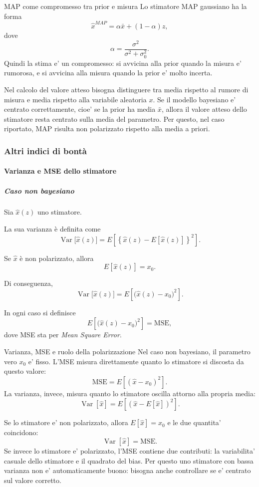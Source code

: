 \documentclass[11pt,a4paper]{article}
\begin{document}
\begin{spiegazione}{MAP come compromesso tra prior e misura}
Lo stimatore MAP gaussiano ha la forma
\[
\hat x^{MAP}
=
\alpha \bar x+(1-\alpha)z,
\]
dove
\[
\alpha=\frac{\sigma^2}{\sigma^2+\sigma_0^2}.
\]
Quindi la stima e' un compromesso: si avvicina alla prior quando la misura e' rumorosa, e si avvicina alla misura quando la prior e' molto incerta.

Nel calcolo del valore atteso bisogna distinguere tra media rispetto al rumore di misura e media rispetto alla variabile aleatoria $x$. Se il modello bayesiano e' centrato correttamente, cioe' se la prior ha media $\bar x$, allora il valore atteso dello stimatore resta centrato sulla media del parametro. Per questo, nel caso riportato, MAP risulta non polarizzato rispetto alla media a priori.
\end{spiegazione}

\subsubsection*{Altri indici di bontà}

\paragraph{Varianza e MSE dello stimatore}

\subparagraph*{Caso non bayesiano}
Sia $\hat x(z)$ uno stimatore.

La sua varianza è definita come
\[
\operatorname{Var}\!\bigl[\hat x(z)\bigr]
=
E\!\left[
\left\{\hat x(z)-E[\hat x(z)]\right\}^2
\right].
\]

Se \(\hat x\) è non polarizzato, allora
\[
E[\hat x(z)] = x_0.
\]

Di conseguenza,
\[
\operatorname{Var}\!\bigl[\hat x(z)\bigr]
=
E\!\left[
\bigl(\hat x(z)-x_0\bigr)^2
\right].
\]

In ogni caso si definisce
\[
E\!\left[
\bigl(\hat x(z)-x_0\bigr)^2
\right]
=
\mathrm{MSE},
\]
dove MSE sta per \emph{Mean Square Error}.

\begin{spiegazione}{Varianza, MSE e ruolo della polarizzazione}
Nel caso non bayesiano, il parametro vero $x_0$ e' fisso. L'MSE misura direttamente quanto lo stimatore si discosta da questo valore:
\[
\mathrm{MSE}=E[(\hat x-x_0)^2].
\]
La varianza, invece, misura quanto lo stimatore oscilla attorno alla propria media:
\[
\operatorname{Var}[\hat x]
=E[(\hat x-E[\hat x])^2].
\]

Se lo stimatore e' non polarizzato, allora $E[\hat x]=x_0$ e le due quantita' coincidono:
\[
\operatorname{Var}[\hat x]=\mathrm{MSE}.
\]
Se invece lo stimatore e' polarizzato, l'MSE contiene due contributi: la variabilita' casuale dello stimatore e il quadrato del bias. Per questo uno stimatore con bassa varianza non e' automaticamente buono: bisogna anche controllare se e' centrato sul valore corretto.
\end{spiegazione}
\end{document}
